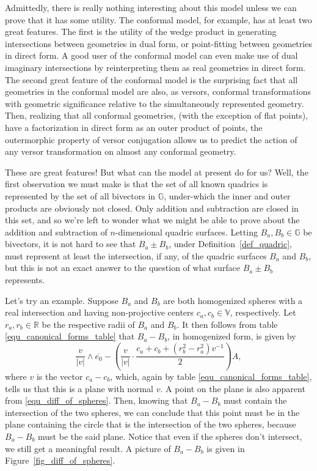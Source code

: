 \documentclass{ecgd-l}
\newcommand{\G}{\mathbb{G}}
\newcommand{\V}{\mathbb{V}}
\newcommand{\R}{\mathbb{R}}
\theoremstyle{definition}
\theoremstyle{remark}
\numberwithin{equation}{section}
\begin{document}
Admittedly, there is really nothing interesting about this model unless we can
prove that it has some utility.  The conformal model, for example, has at least
two great features.  The first is the utility of the wedge product in generating
intersections between geometries in dual form, or point-fitting between
geometries in direct form.  A good user of the conformal model can even
make use of dual imaginary intersections by reinterpreting them as real geometries
in direct form.  The second great feature of the conformal model is the
surprising fact that all geometries in the conformal model are also, as versors, conformal transformations
with geometric significance relative to the simultaneously represented geometry.
Then, realizing that all conformal geometries, (with the exception of flat points), have
a factorization in direct form as an outer product of points, the outermorphic
property of versor conjugation allows us to predict the action of any versor
transformation on almost any conformal geometry.

These are great features!  But what can the model at present do for us?  Well,
the first observation we must make is that the set of all known quadrics
is represented by the set of all bivectors in $\G$, under-which the inner
and outer products are obviously not closed.  Only addition and subtraction
are closed in this set, and so we're left to wonder what we might be able
to prove about the addition and subtraction of $n$-dimensional quadric surfaces.
Letting $B_a,B_b\in\G$ be bivectors, it is not hard to see that $B_a\pm B_b$, under
Definition~\ref{def_quadric}, must represent at least the intersection, if any,
of the quadric surfaces $B_a$ and $B_b$, but this is not an exact answer to the
question of what surface $B_a\pm B_b$ represents.

Let's try an example.  Suppose $B_a$ and $B_b$ are both homogenized spheres with
a real intersection and having
non-projective centers $c_a,c_b\in\V$, respectively.  Let $r_a,r_b\in\R$
be the respective radii of $B_a$ and $B_b$.  It then follows from
table \eqref{equ_canonical_forms_table} that $B_a-B_b$, in homogenized
form, is given by
\begin{equation}\label{equ_diff_of_spheres}
\frac{v}{|v|}\wedge\overline{e_0}-\left(\frac{v}{|v|}\cdot\frac{c_a+c_b+(r_b^2-r_a^2)v^{-1}}{2}\right)A,
\end{equation}
where $v$ is the vector $c_a-c_b$, which, again by table \eqref{equ_canonical_forms_table},
tells us that this is a plane with normal $v$.  A point on the plane is also apparent from
\eqref{equ_diff_of_spheres}.  Then, knowing that $B_a-B_b$ must contain the intersection of the
two spheres, we can conclude that this point must be in the plane containing the circle that is
the intersection of the two spheres, because $B_a-B_b$ must be the said plane.  Notice
that even if the spheres don't intersect, we still get a meaningful result.  A picture of
$B_a-B_b$ is given in Figure~\ref{fig_diff_of_spheres}.
\end{document}
